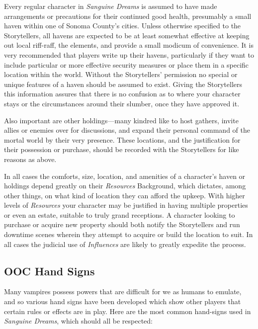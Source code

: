Every regular character in \emph{Sanguine Dreams} is assumed to have made arrangements or 
precautions for their continued good health, presumably a small haven within one of Sonoma 
County's cities.  Unless otherwise specified to the Storytellers, all havens are expected to be 
at least somewhat effective at keeping out local riff-raff, the elements, and provide a small 
modicum of convenience.  It is very recommended that players write up their havens, particularly 
if they want to include particular or more effective security measures or place them in a specific 
location within the world.  Without the Storytellers' permission no special or unique features of 
a haven should be assumed to exist.  Giving the Storytellers this information assures that there is 
no confusion as to where your character stays or the circumstances around their slumber, once they 
have approved it.

Also important are other holdings---many kindred like to host gathers, invite allies or 
enemies over for discussions, and expand their personal command of the mortal world by their 
very presence.  These locations, and the justification for their possession or purchase, should 
be recorded with the Storytellers for like reasons as above.

In all cases the comforts, size, location, and amenities of a character's haven or holdings 
depend greatly on their \emph{Resources} Background, which dictates, among other things, on what 
kind of location they can afford the upkeep.  With higher levels of \emph{Resources} your character 
may be justified in having multiple properties or even an estate, suitable to truly grand receptions.  
A character looking to purchase or acquire new property should both notify the Storytellers and run 
downtime scenes wherein they attempt to acquire or build the location to suit.  In all cases the 
judicial use of \emph{Influences} are likely to greatly expedite the process.

\subsection{OOC Hand Signs}
Many vampires possess powers that are difficult for we as humans to emulate, and so various hand signs 
have been developed which show other players that certain rules or effects are in play.  Here are the most 
common hand-signs used in \emph{Sanguine Dreams}, which should all be respected:

